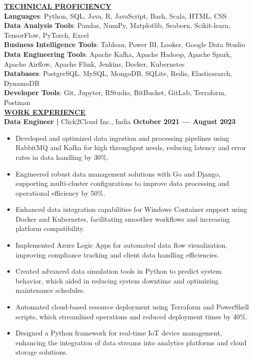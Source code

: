 \documentclass{article}
\begin{document}
\noindent \textbf{\underline{TECHNICAL PROFICIENCY}} \\
\textbf{Languages}{: \small Python, SQL, Java, R, JavaScript, Bash, Scala, HTML, CSS} \\
\textbf{Data Analysis Tools}{: \small Pandas, NumPy, Matplotlib, Seaborn, Scikit-learn, TensorFlow, PyTorch, Excel} \\
\textbf{Business Intelligence Tools}{: \small Tableau, Power BI, Looker, Google Data Studio} \\
\textbf{Data Engineering Tools}{: \small Apache Kafka, Apache Hadoop, Apache Spark, Apache Airflow, Apache Flink, Jenkins, Docker, Kubernetes} \\
\textbf{Databases}{: \small PostgreSQL, MySQL, MongoDB, SQLite, Redis, Elasticsearch, DynamoDB} \\
\textbf{Developer Tools}{: \small Git, Jupyter, RStudio, BitBucket, GitLab, Terraform, Postman} \\

\noindent \textbf{\underline{WORK EXPERIENCE}} \\
\noindent \textbf{Data Engineer | } Click2Cloud Inc., India  \hfill \textbf{October 2021 — August 2023}
\begin{itemize}[noitemsep,nolistsep,leftmargin=*]
\item {\small Developed and optimized data ingestion and processing pipelines using RabbitMQ and Kafka for high throughput needs, reducing latency and error rates in data handling by 30\%.}
\item {\small Engineered robust data management solutions with Go and Django, supporting multi-cluster configurations to improve data processing and operational efficiency by 50\%.}
\item {\small Enhanced data integration capabilities for Windows Container support using Docker and Kubernetes, facilitating smoother workflows and increasing platform compatibility.}
\item {\small Implemented Azure Logic Apps for automated data flow visualization, improving compliance tracking and client data handling efficiencies.}
\item {\small Created advanced data simulation tools in Python to predict system behavior, which aided in reducing system downtime and optimizing maintenance schedules.}
\item {\small Automated cloud-based resource deployment using Terraform and PowerShell scripts, which streamlined operations and reduced deployment times by 40\%.}
\item {\small Designed a Python framework for real-time IoT device management, enhancing the integration of data streams into analytics platforms and cloud storage solutions.}
\end{itemize}
\end{document}
